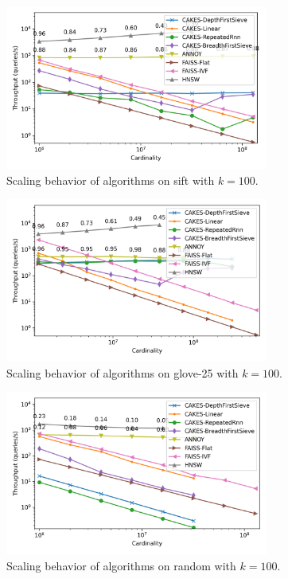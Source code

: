 \documentclass[review,supplement,onefignum,onetabnum]{siamonline220329}
\begin{document}
\begin{figure}[ht!]
    \centering
    \includegraphics[width=3.4in]{plots/sift-knn-100.png}
    \caption{
        Scaling behavior of algorithms on sift with $k=100$. 
    }
    \label{fig:supplement:sift-k-100}
\end{figure}

\begin{figure}[ht!]
    \centering
    \includegraphics[width=3.4in]{plots/glove-25-knn-100.png}
    \caption{
        Scaling behavior of algorithms on glove-25 with $k=100$. 
    }
    \label{fig:supplement:glove-25-k-100}
\end{figure}

\begin{figure}[ht!]
    \centering
    \includegraphics[width=3.4in]{plots/random-knn-100.png}
    \caption{
        Scaling behavior of algorithms on random with $k=100$. 
    }
    \label{fig:supplement:random-k-100}
\end{figure}
\end{document}
